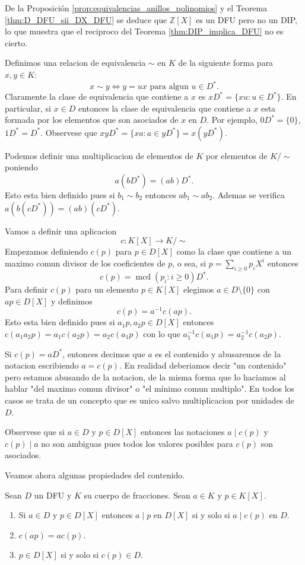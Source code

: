 De la Proposición \ref{prop:equivalencias_anillos_polinomios} y el Teorema \ref{thm:D_DFU_sii_DX_DFU} se deduce que ${\mathbb{Z}}[X]$ es un DFU pero no un DIP, lo que muestra que el reciproco del Teorema \ref{thm:DIP_implica_DFU} no es cierto.

Definimos una relacion de equivalencia $\sim$ en $K$ de la siguiente forma para $x,y\in K$:
\[
x\sim y\Leftrightarrow y=ux\text{ para algun }u\in D^{*}.
\]
Claramente la clase de equivalencia que contiene a $x$ es $xD^{*}=\{xu:u\in D^{*}\}$. En particular, si $x\in D$ entonces la clase de equivalencia que contiene a $x$ esta formada por los elementos que son asociados de $x$ en $D$. Por ejemplo, $0D^{*}=\{0\}$, $1D^{*}=D^{*}$. Observese que $xyD^{*}=\{xa:a\in yD^{*}\}=x(yD^{*})$.

Podemos definir una multiplicacion de elementos de $K$ por elementos de $K/\sim$ poniendo
\[
a(bD^{*})=(ab)D^{*}.
\]
Esto esta bien definido pues si $b_{1}\sim b_{2}$ entonces $ab_{1}\sim ab_{2}$. Ademas se verifica $a(b(cD^{*}))=(ab)(cD^{*})$.

Vamos a definir una aplicacion
\[
c:K[X]\to K/\sim
\]
Empezamos definiendo $c(p)$ para $p\in D[X]$ como la clase que contiene a un maximo comun divisor de los coeficientes de $p$, o sea, si $p=\sum_{i\geq 0}p_{i}X^{i}$ entonces
\[
c(p)=\operatorname{mcd}(p_{i}:i\geq 0)D^{*}.
\]
Para definir $c(p)$ para un elemento $p\in K[X]$ elegimos $a\in D\setminus\{0\}$ con $ap\in D[X]$ y definimos
\[
c(p)=a^{-1}c(ap).
\]
Esto esta bien definido pues si $a_{1}p,a_{2}p\in D[X]$ entonces $c(a_{1}a_{2}p)=a_{1}c(a_{2}p)=a_{2}c(a_{1}p)$ con lo que $a_{1}^{-1}c(a_{1}p)=a_{2}^{-1}c(a_{2}p)$.

Si $c(p)=aD^{*}$, entonces decimos que $a$ es el contenido y abusaremos de la notacion escribiendo $a=c(p)$. En realidad deberiamos decir "un contenido" pero estamos abusando de la notacion, de la misma forma que lo haciamos al hablar "del maximo comun divisor" o "el mínimo comun multiplo". En todos los casos se trata de un concepto que es unico salvo multiplicacion por unidades de $D$.

Observese que si $a\in D$ y $p\in D[X]$ entonces las notaciones $a\mid c(p)$ y $c(p)\mid a$ no son ambiguas pues todos los valores posibles para $c(p)$ son asociados.

Veamos ahora algunas propiedades del contenido.

\begin{proposition}{}{}
Sean $D$ un DFU y $K$ su cuerpo de fracciones. Sean $a \in K$ y $p \in K[X]$.

\begin{enumerate}
\item Si $a \in D$ y $p \in D[X]$ entonces $a \mid p$ en $D[X]$ si y solo si $a \mid c(p)$ en $D$.
\item $c(ap) = ac(p)$.
\item $p \in D[X]$ si y solo si $c(p) \in D$.
\end{enumerate}
\end{proposition}

